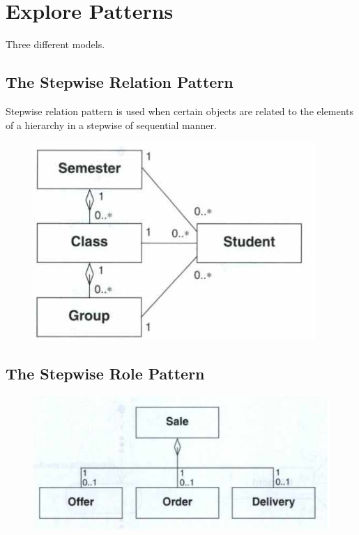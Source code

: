 \section{Explore Patterns \ooad[104]}
Three different models.

\subsection*{The Stepwise Relation Pattern \ooad[104]}
Stepwise relation pattern is used when certain objects are related to the elements of a hierarchy in a stepwise of sequential manner.
\begin{figure}[H]
    \centering
    \includegraphics[width=\linewidth/2]{parts/2_problem_domain_analysis/behavior/figures/stepwise_relation.png}
\end{figure}
\subsection*{The Stepwise Role Pattern \ooad[104]} 
\begin{figure}[H]
    \centering
    \includegraphics[width=\linewidth/2]{parts/2_problem_domain_analysis/behavior/figures/stepwise_role.png}
\end{figure}

